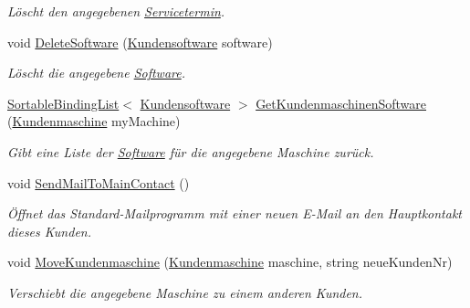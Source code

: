 \begin{DoxyCompactItemize}
\begin{DoxyCompactList}\small\item\em Löscht den angegebenen \hyperlink{class_products_1_1_model_1_1_entities_1_1_servicetermin}{Servicetermin}. \end{DoxyCompactList}\item 
void \hyperlink{class_products_1_1_model_1_1_entities_1_1_kunde_a7b7c6038531eec2adee8f7adab718056}{Delete\+Software} (\hyperlink{class_products_1_1_model_1_1_entities_1_1_kundensoftware}{Kundensoftware} software)
\begin{DoxyCompactList}\small\item\em Löscht die angegebene \hyperlink{class_products_1_1_model_1_1_entities_1_1_software}{Software}. \end{DoxyCompactList}\item 
\hyperlink{class_products_1_1_common_1_1_sortable_binding_list}{Sortable\+Binding\+List}$<$ \hyperlink{class_products_1_1_model_1_1_entities_1_1_kundensoftware}{Kundensoftware} $>$ \hyperlink{class_products_1_1_model_1_1_entities_1_1_kunde_a038f0b50660bb54aa2a12f870e405d7b}{Get\+Kundenmaschinen\+Software} (\hyperlink{class_products_1_1_model_1_1_entities_1_1_kundenmaschine}{Kundenmaschine} my\+Machine)
\begin{DoxyCompactList}\small\item\em Gibt eine Liste der \hyperlink{class_products_1_1_model_1_1_entities_1_1_software}{Software} für die angegebene Maschine zurück. \end{DoxyCompactList}\item 
void \hyperlink{class_products_1_1_model_1_1_entities_1_1_kunde_a10eb487b98945b644f2d85214d44685f}{Send\+Mail\+To\+Main\+Contact} ()
\begin{DoxyCompactList}\small\item\em Öffnet das Standard-\/\+Mailprogramm mit einer neuen E-\/\+Mail an den Hauptkontakt dieses Kunden. \end{DoxyCompactList}\item 
void \hyperlink{class_products_1_1_model_1_1_entities_1_1_kunde_a713bf0c1c0dfd1743ef1913ddf9632ef}{Move\+Kundenmaschine} (\hyperlink{class_products_1_1_model_1_1_entities_1_1_kundenmaschine}{Kundenmaschine} maschine, string neue\+Kunden\+Nr)
\begin{DoxyCompactList}\small\item\em Verschiebt die angegebene Maschine zu einem anderen Kunden. \end{DoxyCompactList}\item 

\end{DoxyCompactItemize}
